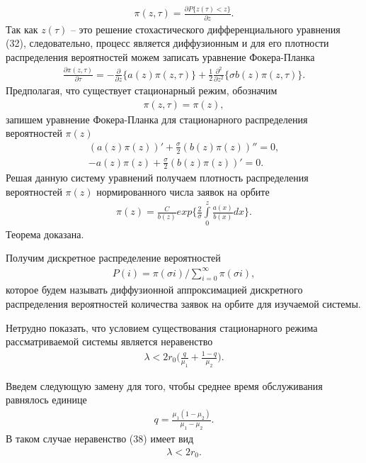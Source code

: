 \begin{align*}
	\pi(z,\tau)=\frac{\partial P\{z(\tau)<z\}}{\partial z}.
\end{align*}
Так как $z(\tau)$ -- это решение стохастического дифференциального уравнения (32), следовательно, процесс является диффузионным и для его плотности распределения вероятностей можем записать уравнение Фокера-Планка
\begin{align}
	\frac{\partial \pi (z,\tau)}{\partial \tau}=-\frac{\partial}{\partial z}\{a(z)\pi(z,\tau)\} 
	+\frac{1}{2}\frac{\partial^2}{\partial z^2}\{\sigma b(z)\pi(z,\tau)\}.
\end{align}
Предполагая, что существует стационарный режим, обозначим 
\begin{align}
	\pi (z,\tau)=\pi(z),
\end{align}
запишем уравнение Фокера-Планка для стационарного распределения вероятностей $\pi{(z)}$
\begin{align*}
	(a(z)\pi(z))'+\frac{\sigma}{2}(b(z)\pi(z))''=0,\\
	-a(z)\pi(z)+\frac{\sigma}{2}(b(z)\pi(z))'=0.
\end{align*}
Решая данную систему уравнений получаем плотность распределения вероятностей $\pi{(z)}$ нормированного числа заявок на орбите
\begin{align}
	\pi (z)= \frac{C}{b(z)}exp\bigg\{\frac{2}{\sigma} \int\limits_0^z \frac{a(x)}{b(x)}dx\bigg\}.
\end{align} 
Теорема доказана.

Получим дискретное распределение вероятностей
\begin{align}
	P(i)=\pi(\sigma i)/\sum\limits_{i=0}^{\infty} \pi(\sigma i),
\end{align} 
которое будем называть диффузионной аппроксимацией дискретного распределения вероятностей количества заявок на орбите для изучаемой системы.

Нетрудно показать, что условием существования стационарного
режима рассматриваемой системы является неравенство 
\begin{align}
	\lambda<2r_{0}\bigg(\frac{q}{\mu_{1}}+\frac{1-q}{\mu_{2}}\bigg).
\end{align}

Введем следующую замену для того, чтобы среднее время обслуживания равнялось единице
\begin{align*}
	q=\frac{\mu_{1}(1-\mu_{2})}{\mu_{1}-\mu_{2}}.
\end{align*}
В таком случае неравенство (38) имеет вид
\begin{align*}
	\lambda<2r_{0}.
\end{align*}
	\newpage 

